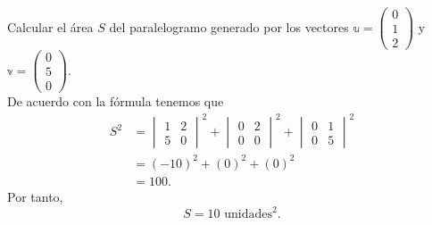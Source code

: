 \begin{example}
    Calcular el área $S$ del paralelogramo generado por los vectores $\mathbb{u} = \begin{pmatrix}
        0 \\
        1 \\
        2
    \end{pmatrix}$ y $\mathbb{v} = \begin{pmatrix}
        0 \\
        5 \\
        0
    \end{pmatrix}$. \\
    \solucion  De acuerdo con la fórmula tenemos que
    $$
    \begin{aligned}
        S^2 & =\begin{vmatrix}
        1 & 2 \\
        5 & 0
        \end{vmatrix}^2+\begin{vmatrix}
        0 & 2 \\
        0 & 0
        \end{vmatrix}^2+\begin{vmatrix}
        0 & 1 \\
        0 & 5
        \end{vmatrix}^2 \\
        & = (-10)^2+(0)^2+(0)^2 \\
        & =100.
    \end{aligned}
    $$\newpage\noindent
    Por tanto,
    $$S=10 \text{ unidades}^2.$$
\end{example}

